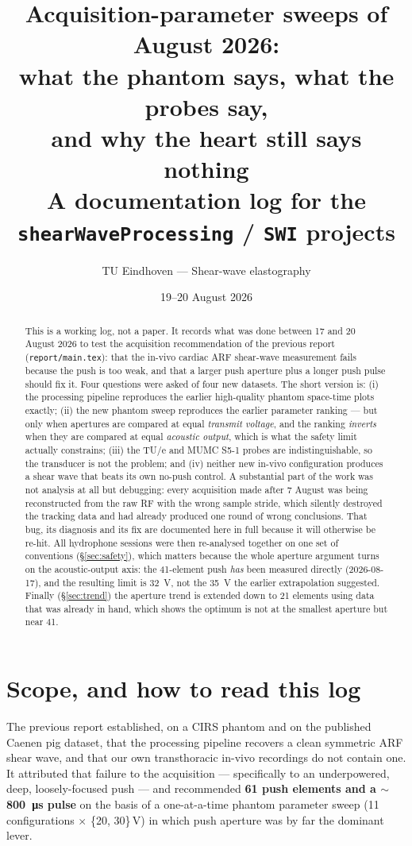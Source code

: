 \documentclass[11pt,a4paper]{article}
\title{\vspace{-1.5em}\textbf{Acquisition-parameter sweeps of August 2026:\\
what the phantom says, what the probes say,\\ and why the heart still says nothing}\\[0.4em]
\large A documentation log for the \texttt{shearWaveProcessing} / \texttt{SWI} projects}
\author{TU Eindhoven --- Shear-wave elastography}
\date{19--20 August 2026}
\begin{document}
\maketitle

\begin{abstract}
\noindent
This is a working log, not a paper. It records what was done between 17 and 20 August 2026 to test the
acquisition recommendation of the previous report (\texttt{report/main.tex}): that the in-vivo cardiac
ARF shear-wave measurement fails because the push is too weak, and that a larger push aperture plus a
longer push pulse should fix it. Four questions were asked of four new datasets. The short version is:
(i) the processing pipeline reproduces the earlier high-quality phantom space-time plots exactly;
(ii) the new phantom sweep reproduces the earlier parameter ranking --- but only when apertures are
compared at equal \emph{transmit voltage}, and the ranking \emph{inverts} when they are compared at
equal \emph{acoustic output}, which is what the safety limit actually constrains; (iii) the TU/e and
MUMC S5-1 probes are indistinguishable, so the transducer is not the problem; and (iv) neither new
in-vivo configuration produces a shear wave that beats its own no-push control. A substantial part of
the work was not analysis at all but debugging: every acquisition made after 7 August was being
reconstructed from the raw RF with the wrong sample stride, which silently destroyed the tracking data
and had already produced one round of wrong conclusions. That bug, its diagnosis and its fix are
documented here in full because it will otherwise be re-hit.
All hydrophone sessions were then re-analysed together on one set of conventions
(\S\ref{sec:safety}), which matters because the whole aperture argument turns on the acoustic-output
axis: the 41-element push \emph{has} been measured directly (2026-08-17), and the resulting limit is
\SI{32}{\volt}, not the \SI{35}{\volt} the earlier extrapolation suggested. Finally
(\S\ref{sec:trend}) the aperture trend is extended down to 21 elements using data that was already
in hand, which shows the optimum is not at the smallest aperture but near 41.
\end{abstract}

\tableofcontents

\section{Scope, and how to read this log}
The previous report established, on a CIRS phantom and on the published Caenen pig dataset, that the
processing pipeline recovers a clean symmetric ARF shear wave, and that our own transthoracic in-vivo
recordings do not contain one. It attributed that failure to the acquisition --- specifically to an
underpowered, deep, loosely-focused push --- and recommended \textbf{61 push elements and a
$\sim$\SI{800}{\micro\second} pulse} on the basis of a one-at-a-time phantom parameter sweep
(11 configurations $\times$ \{20, 30\}\,V) in which push aperture was by far the dominant lever.
\end{document}
